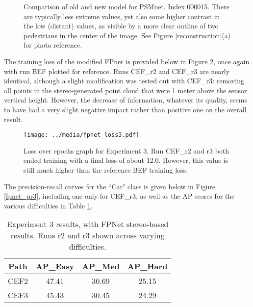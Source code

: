 \begin{figure}[H]
	\centering
	\caption{Comparison of old and new model for PSMnet. Index 000015. There are typically less extreme values, yet also some higher contrast in the low (distant) values, as visible by a more clear outline of two pedestrians in the center of the image. See Figure \ref{reconstruction}(a) for photo reference.}
	\label{new_psmnet}
\end{figure}


The training loss of the modified FPnet is provided below in Figure \ref{fpnet_loss3}, once again with run BEF plotted for reference. Runs CEF\_r2 and CEF\_r3 are nearly identical, although a slight modification was tested out with CEF\_r3: removing all points in the stereo-generated point cloud that were 1 meter above the sensor vertical height. However, the decrease of information, whatever its quality, seems to have had a very slight negative impact rather than positive one on the overall result.

\begin{figure}[ht]
	\centering
	\texttt{[image: ../media/fpnet\_loss3.pdf]}
	\caption{Loss over epochs graph for Experiment 3. Run CEF\_r2 and r3 both ended training with a final loss of about 12.0. However, this value is still much higher than the reference BEF training loss.}
	\label{fpnet_loss3}
\end{figure}


The precision-recall curves for the ``Car" class is given below in Figure \ref{fpnet_pr3}, including one only for CEF\_r3, as well as the AP scores for the various difficulties in Table \ref{fpnet_ap3}.

\begin{table}[ht]
	\centering
	\caption{Experiment 3 results, with FPNet stereo-based results. Runs r2 and r3 shown across varying difficulties.}
	\begin{tabular}{|c|c|c|c|}
		\hline
		\b{Path} & \b{AP\_Easy} & \b{AP\_Med} & \b{AP\_Hard} \\ \hline
		CEF2   &    47.41     &    30.69    &    25.15       \\ \hline
		CEF3   &    45.43     &    30.45    &    24.29       \\ \hline
	\end{tabular}
	\label{fpnet_ap3}
\end{table}

